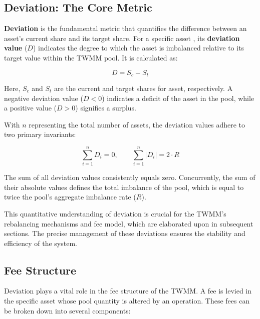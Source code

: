 \subsection{Deviation: The Core Metric}

\textbf{Deviation} is the fundamental metric that quantifies the difference between an asset's current share and its target share. For a specific asset , its \textbf{deviation value} ($D$) indicates the degree to which the asset is imbalanced relative to its target value within the TWMM pool. It is calculated as:

\begin{equation}
	\label{eq:deviation}
	D = S_{c} - S_{t}
\end{equation}

Here, $S_{c}$ and $S_{t}$ are the current and target shares for asset, respectively. A negative deviation value ($D < 0$) indicates a deficit of the asset in the pool, while a positive value ($D > 0$) signifies a surplus.

With $n$ representing the total number of assets, the deviation values adhere to two primary invariants:

\begin{equation}
	\label{eq:invariant_deviation}
	\sum_{i=1}^{n} D_i = 0, \qquad \sum_{i=1}^{n} |D_i| = 2 \cdot R
\end{equation}

The sum of all deviation values consistently equals zero. Concurrently, the sum of their absolute values defines the total imbalance of the pool, which is equal to twice the pool's aggregate imbalance rate ($R$).

This quantitative understanding of deviation is crucial for the TWMM's rebalancing mechanisms and fee model, which are elaborated upon in subsequent sections. The precise management of these deviations ensures the stability and efficiency of the system.

\subsection{Fee Structure}

Deviation plays a vital role in the fee structure of the TWMM. A fee is levied in the specific asset whose pool quantity is altered by an operation. These fees can be broken down into several components:

